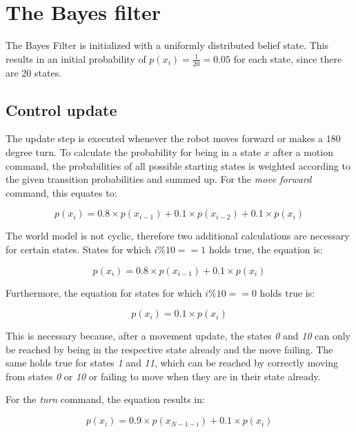 \documentclass[10pt,a4paper]{article}
\begin{document}
	\section{The Bayes filter}
	The Bayes Filter is initialized with a uniformly distributed belief state. This results in an initial probability of $p(x_i)=\frac{1}{20}=0.05$ for each state, since there are 20 states.
	
		\subsection{Control update}
		The update step is executed whenever the robot moves forward or makes a 180 degree turn.
		To calculate the probability for being in a state $x$ after a motion command, the probabilities of all possible starting states is weighted according to the given transition probabilities and summed up. For the \textit{move forward} command, this equates to:
		
		\begin{displaymath}
			p(x_i) = 0.8\times p(x_{i-1}) + 0.1\times p(x_{i-2}) + 0.1\times p(x_i)
		\end{displaymath}
		
		The world model is not cyclic, therefore two additional calculations are necessary for certain states.
		States for which $i\%10==1$ holds true, the equation is:
		
		\begin{displaymath}
		p(x_i) = 0.8\times p(x_{i-1}) + 0.1\times p(x_i)
		\end{displaymath}
		
		Furthermore, the equation for states for which $i\%10==0$ holds true is:
		
		\begin{displaymath}
		p(x_i) = 0.1\times p(x_i)
		\end{displaymath}
		
		This is necessary because, after a movement update, the states \textit{0} and \textit{10} can only be reached by being in the respective state already and the move failing. The same holds true for states \textit{1} and \textit{11}, which can be reached by correctly moving from states \textit{0} or \textit{10} or failing to move when they are in their state already.
		
		For the \textit{turn} command, the equation results in:
		
		\begin{displaymath}
			p(x_i) = 0.9\times p(x_{N-1-i}) + 0.1\times p(x_i)
		\end{displaymath}
		
\end{document}
